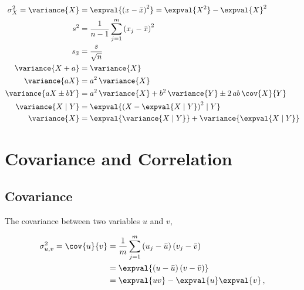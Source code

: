 \begin{subequations}\label{eq:stats:var_relations}
\begin{align}
\sigma_{X}^{2} = \variance{X} &= \expval{\left(x-\bar{x}\right)^{2}} = \expval{X^{2}} - \expval{X}^{2} \label{eq:stats:var_relations:def} \\
s^{2} &= \frac{1}{n-1} \sum_{j=1}^{m} \left( x_{j} - \bar{x}\right)^{2} \label{eq:stats:var_relations:sample} \\
s_{\bar{x}} &= \frac{s}{\sqrt{n}} \label{eq:stats:var_relations:standard_error_of_mean} \\
\variance{X+a} &= \variance{X} \label{eq:stats:var_relations:add} \\
\variance{a X} &= a^{2} \, \variance{X} \label{eq:stats:var_relations:mult} \\
\variance{a X \pm b Y} &= a^{2} \, \variance{X} + b^{2} \, \variance{Y} \pm 2 \, ab \, \cov{X}{Y} \label{eq:stats:var_relations:linear} \\
\variance{X \mid Y} &= \expval{\left(X - \expval{X \mid Y}\right)^{2} \mid Y} \label{eq:stats:var_relations:conditional1} \\
\variance{X} &= \expval{\variance{X \mid Y}} + \variance{\expval{X \mid Y}} \label{eq:stats:var_relations:conditional2}
\end{align}
\end{subequations}

\section{Covariance and Correlation}
\label{stats:corr_covar}

\subsection{Covariance}
\label{stats:corr_covar:covariance}

The covariance between two variables $u$ and $v$,

\begin{equation}\label{eq:stats:covar}
\begin{split}
\sigma_{u,v}^{2} = \cov{u}{v} &= \frac{1}{m}\sum_{j=1}^{m}\left(u_{j}-\bar{u}\right)\left(v_{j}-\bar{v}\right) \\
&= \expval{\left(u-\bar{u}\right)\left(v-\bar{v}\right)} \\
&= \expval{u v} - \expval{u}\expval{v}\,,
\end{split}
\end{equation}

